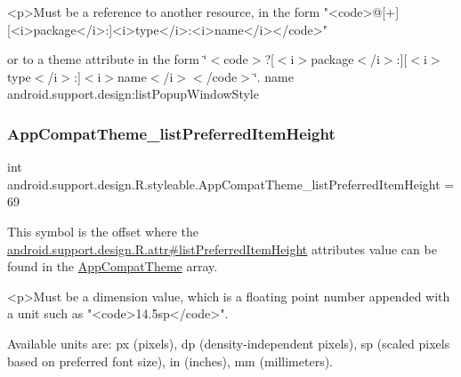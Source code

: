 \begin{DoxyVerb}      <p>Must be a reference to another resource, in the form "<code>@[+][<i>package</i>:]<i>type</i>:<i>name</i></code>"
\end{DoxyVerb}
 or to a theme attribute in the form \char`\"{}$<$code$>$?\mbox{[}$<$i$>$package$<$/i$>$\+:\mbox{]}\mbox{[}$<$i$>$type$<$/i$>$\+:\mbox{]}$<$i$>$name$<$/i$>$$<$/code$>$\char`\"{}.  name android.\+support.\+design\+:list\+Popup\+Window\+Style \mbox{\label{classandroid_1_1support_1_1design_1_1R_1_1styleable_a8cff2e543a4edae5b403be6bb3c47eec}} 
\subsubsection{\texorpdfstring{App\+Compat\+Theme\+\_\+list\+Preferred\+Item\+Height}{AppCompatTheme\_listPreferredItemHeight}}
{\footnotesize\ttfamily int android.\+support.\+design.\+R.\+styleable.\+App\+Compat\+Theme\+\_\+list\+Preferred\+Item\+Height = 69\hspace{0.3cm}{\ttfamily [static]}}

This symbol is the offset where the \hyperlink{classandroid_1_1support_1_1design_1_1R_1_1attr_afd914d37ccd3774be092e75022f888ee}{android.\+support.\+design.\+R.\+attr\#list\+Preferred\+Item\+Height} attribute\textquotesingle{}s value can be found in the \hyperlink{classandroid_1_1support_1_1design_1_1R_1_1styleable_afb351dc8de20cbd4c89abe360373010c}{App\+Compat\+Theme} array.

\begin{DoxyVerb}      <p>Must be a dimension value, which is a floating point number appended with a unit such as "<code>14.5sp</code>".
\end{DoxyVerb}
 Available units are\+: px (pixels), dp (density-\/independent pixels), sp (scaled pixels based on preferred font size), in (inches), mm (millimeters). 

